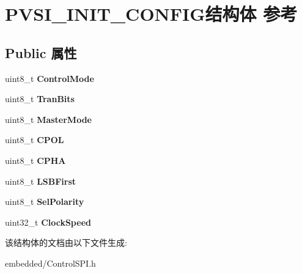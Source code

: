 \hypertarget{structVSI__INIT__CONFIG}{}\section{P\+V\+S\+I\+\_\+\+I\+N\+I\+T\+\_\+\+C\+O\+N\+F\+I\+G结构体 参考}
\label{structVSI__INIT__CONFIG}
\subsection*{Public 属性}
\begin{DoxyCompactItemize}
\item 
\mbox{\label{structVSI__INIT__CONFIG_abf6c699fe55a297a95d53428f06960cc}} 
uint8\+\_\+t {\bfseries Control\+Mode}
\item 
\mbox{\label{structVSI__INIT__CONFIG_a93d808927db3c4613686b6bcbbc4f4d2}} 
uint8\+\_\+t {\bfseries Tran\+Bits}
\item 
\mbox{\label{structVSI__INIT__CONFIG_af8bfd7ec08a517d5df3e3c877b52fa41}} 
uint8\+\_\+t {\bfseries Master\+Mode}
\item 
\mbox{\label{structVSI__INIT__CONFIG_a2efc57b935a880477632999a79608b39}} 
uint8\+\_\+t {\bfseries C\+P\+OL}
\item 
\mbox{\label{structVSI__INIT__CONFIG_ae502a79d18515cbcbf36412fe4c039b3}} 
uint8\+\_\+t {\bfseries C\+P\+HA}
\item 
\mbox{\label{structVSI__INIT__CONFIG_a48ce9ef20e39372984c1992a646e6d9a}} 
uint8\+\_\+t {\bfseries L\+S\+B\+First}
\item 
\mbox{\label{structVSI__INIT__CONFIG_ac9c417d69867d3d8877a5d75c7820700}} 
uint8\+\_\+t {\bfseries Sel\+Polarity}
\item 
\mbox{\label{structVSI__INIT__CONFIG_a79336fe2a5b64f0d75a2d072d24996d3}} 
uint32\+\_\+t {\bfseries Clock\+Speed}
\end{DoxyCompactItemize}


该结构体的文档由以下文件生成\+:\begin{DoxyCompactItemize}
\item 
embedded/Control\+S\+P\+I.\+h\end{DoxyCompactItemize}
